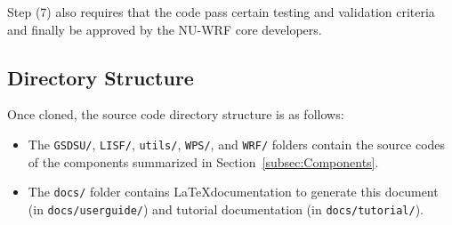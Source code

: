 Step (7) also requires that the code pass certain testing and validation criteria and finally be approved by the  NU-WRF core developers.
\hfill \break
\mbox{}\\

\subsection{Directory Structure}

Once cloned, the source code directory structure is as follows:

\begin{itemize}
  \item The \texttt{GSDSU/}, \texttt{LISF/}, \texttt{utils/}, 
    \texttt{WPS/}, and \texttt{WRF/} folders contain the source codes of the
    components summarized in Section~\ref{subsec:Components}.

  \item The \texttt{docs/} folder contains \LaTeX documentation to generate this document 
  (in \texttt{docs/userguide/}) and  tutorial documentation (in \texttt{docs/tutorial/}).
    

\end{itemize}

